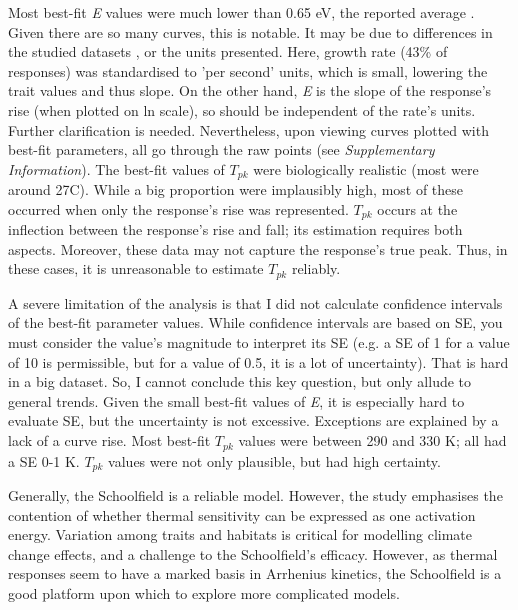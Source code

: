 \documentclass[11pt]{article}
\begin{document}
Most best-fit \textit{E} values were much lower than 0.65 eV, the reported average \cite{Dell2011}. Given there are so many curves, this is notable.
It may be due to differences in the studied datasets \cite{Pawar2016}, %
or the units presented.
Here, growth rate (43\% of responses) was standardised to 'per second' units, which is small, lowering the trait values and thus slope. On the other hand, \textit{E} is the slope of the response's rise (when plotted on ln scale), so should be independent of the rate's units. Further clarification is needed. Nevertheless, upon viewing curves plotted with best-fit parameters, all go through the raw points (see \textit{Supplementary Information}).
The best-fit values of $T_{pk}$ were biologically realistic (most were around 27\degree C). While a big proportion were implausibly high, most of these occurred when only the response's rise was represented. $T_{pk}$ occurs at the inflection between the response's rise and fall; its estimation requires both aspects. Moreover, these data may not capture the response's true peak. Thus, in these cases, it is unreasonable to estimate $T_{pk}$ reliably.


A severe limitation of the analysis is that I did not calculate confidence intervals of the best-fit parameter values. While confidence intervals are based on SE, you must consider the value's magnitude to interpret its SE (e.g. a SE of 1 for a value of 10 is permissible, but for a value of 0.5, it is a lot of uncertainty). That is hard in a big dataset. So, I cannot conclude this key question, but only allude to general trends.
Given the small best-fit values of \textit{E}, it is especially hard to evaluate SE, but the uncertainty is not excessive. Exceptions are explained by a lack of a curve rise. Most best-fit $T_{pk}$ values were between 290 and 330 K; all had a SE 0-1 K. $T_{pk}$ values were not only plausible, but had high certainty.

Generally, the Schoolfield is a reliable model. However, the study emphasises the contention of whether thermal sensitivity can be expressed as one activation energy.
Variation among traits and habitats is critical for modelling climate change effects, and a challenge to the Schoolfield's efficacy. However, as thermal responses seem to have a marked basis in Arrhenius kinetics, the Schoolfield is a good platform upon which to explore more complicated models.
\end{document}
